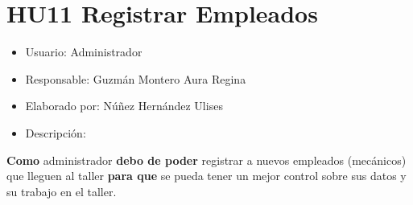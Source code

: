 \section{HU11 Registrar Empleados}
\begin{itemize}
	\item Usuario: Administrador
	\item Responsable: Guzmán Montero Aura Regina
	\item Elaborado por: Núñez Hernández Ulises
	\item Descripción:\\
\end{itemize}

\textbf{Como} administrador \textbf{debo de poder} registrar a nuevos empleados (mecánicos) que lleguen al taller \textbf{para que} se pueda tener un mejor control sobre sus datos y su trabajo en el taller.